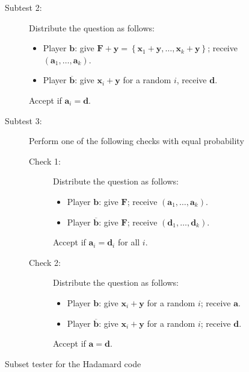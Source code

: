 \documentclass[11pt]{article}
\theoremstyle{plain}
\theoremstyle{definition}
\newcommand {\set} [1] {\ensuremath{ \left\lbrace #1 \right\rbrace }}
\newenvironment{Algorithm}{\begin{framed}}{\end{framed}}
\newcommand{\1}{\mathbb{1}} %
\newcommand{\ba}{\pmb{a}}
\newcommand{\bb}{\pmb{b}}
\newcommand{\bd}{\pmb{d}}
\newcommand{\bx}{\pmb{x}}
\newcommand{\by}{\pmb{y}}
\newcommand{\pmbF}{\pmb{F}}
\begin{document}
\begin{figure}
\begin{Algorithm}
\begin{description}
    \item[Subtest 2:]
    Distribute the question as follows:
        \begin{itemize}
            \item Player $\bb$: give $\pmbF+\by = \set{\bx_1+\by, \ldots, \bx_k+\by}$; receive $(\ba_1, \ldots, \ba_k)$.
            \item Player $\overline{\bb}$: give $\bx_i + \by$ for a random $i$, receive $\bd$.
        \end{itemize}
        Accept if $\ba_i = \bd$.
	\item[Subtest 3:] Perform one of the following checks with equal probability
    \begin{description}
        \item[Check 1:] Distribute the question as follows:
        \begin{itemize}
            \item Player $\bb$: give $\pmbF$; receive $(\ba_1, \ldots, \ba_k)$.
            \item Player $\overline{\bb}$: give $\pmbF$; receive $(\bd_1, \ldots, \bd_k)$.
        \end{itemize}
        Accept if $\ba_i = \bd_i$ for all $i$.
        \item[Check 2:] Distribute the question as follows:
        \begin{itemize}
            \item Player $\bb$: give $\bx_i+\by$ for a random $i$; receive $\ba$.
            \item Player $\overline{\bb}$: give $\bx_i+\by$ for a random $i$; receive $\bd$.
        \end{itemize}
        Accept if $\ba = \bd$.
    \end{description}
\end{description}
\end{Algorithm}
\caption{Subset tester for the Hadamard code}
    \label{fig:hadamardcode}
\end{figure}
\end{document}
